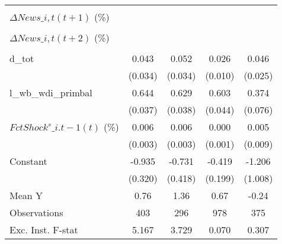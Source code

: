 {\begin{tabular}{l*{4}{c}}
                    &                     &                     &                     &                     \\
\addlinespace
$ \Delta News\_{i,t}(t+1)$ (\%)&                     &                     &                     &                     \\
                    &                     &                     &                     &                     \\
\addlinespace
$ \Delta News\_{i,t}(t+2)$ (\%)&                     &                     &                     &                     \\
                    &                     &                     &                     &                     \\
\addlinespace
d\_tot               &       0.043         &       0.052         &       0.026\sym{**} &       0.046\sym{*}  \\
                    &     (0.034)         &     (0.034)         &     (0.010)         &     (0.025)         \\
\addlinespace
l\_wb\_wdi\_primbal    &       0.644\sym{***}&       0.629\sym{***}&       0.603\sym{***}&       0.374\sym{***}\\
                    &     (0.037)         &     (0.038)         &     (0.044)         &     (0.076)         \\
\addlinespace
$ FctShock^s\_{i.t-1}(t)$ (\%)&       0.006\sym{**} &       0.006\sym{*}  &       0.000         &       0.005         \\
                    &     (0.003)         &     (0.003)         &     (0.001)         &     (0.009)         \\
\addlinespace
Constant            &      -0.935\sym{***}&      -0.731\sym{*}  &      -0.419\sym{**} &      -1.206         \\
                    &     (0.320)         &     (0.418)         &     (0.199)         &     (1.008)         \\
\midrule
Mean Y              &        0.76         &        1.36         &        0.67         &       -0.24         \\
Observations        &         403         &         296         &         978         &         375         \\
Exc. Inst. F-stat   &       5.167         &       3.729         &       0.070         &       0.307         \\
\bottomrule
\end{tabular}
}
